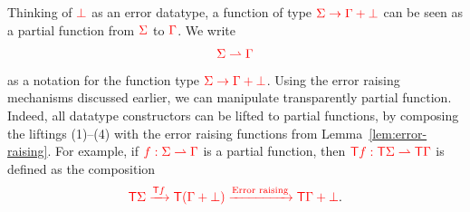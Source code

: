 \begin{example}
Thinking of ${\color{red}{\bot}}$ as an error datatype, a function of type ${\color{red}{\Sigma \to \Gamma +\bot}}$
can be seen as a partial function from ${\color{red}{\Sigma}}$ to ${\color{red}{\Gamma}}$. We write 
\begin{align*}
{\color{red}{\Sigma\rightharpoonup \Gamma}}
\end{align*}
as a notation for the function type ${\color{red}{\Sigma \to \Gamma +\bot}}$.  
Using the error raising mechanisms discussed earlier, we can manipulate transparently partial function. Indeed, all datatype constructors can be lifted to partial functions, by composing the liftings (1)--(4) with the error raising functions from Lemma~\ref{lem:error-raising}. For example, if ${\color{red}{f:\Sigma\rightharpoonup \Gamma}}$ is a partial function, then ${\color{red}{{\color{red}{\mathsf T}}f:{\color{red}{\mathsf T}}\Sigma\rightharpoonup {\color{red}{\mathsf T}}\Gamma}}$ is defined as the composition
\begin{align*}
{\color{red}{{\color{red}{\mathsf T}}\Sigma\xrightarrow{{\color{red}{\mathsf T}}f} {\color{red}{\mathsf T}}(\Gamma+\bot) \xrightarrow{\text{Error raising}} {\color{red}{\mathsf T}}\Gamma +\bot}}.
\end{align*}
\end{example}
 



